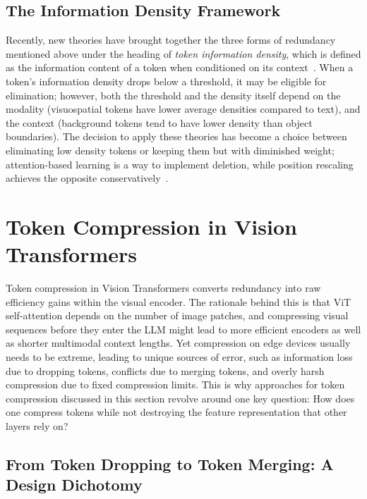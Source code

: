 \documentclass[10pt]{article}
\begin{document}
\subsection{The Information Density Framework}

Recently, new theories have brought together the three forms of redundancy
mentioned above under the heading of \emph{token information density}, which is defined
as the information content of a token when conditioned on its context~\citep{shao2026surveytokencompressionefficient}.
When a token's information density drops below a threshold, it may be
eligible for elimination; however, both the threshold and the density itself depend on
the modality (visuospatial tokens have lower average densities compared to text),
and the context (background tokens tend to have lower density than object boundaries).
The decision to apply these theories has become a choice between eliminating low
density tokens or keeping them but with diminished weight; attention-based learning
is a way to implement deletion, while position rescaling achieves the opposite
conservatively~\citep{mahajan2025attentionguidedalignmentefficient}.
\section{Token Compression in Vision Transformers}
\label{sec:vit}

Token compression in Vision Transformers converts redundancy into raw efficiency gains
within the visual encoder.  The rationale behind this is that ViT self-attention depends
on the number of image patches, and compressing visual sequences before they enter the LLM
might lead to more efficient encoders as well as shorter multimodal context lengths.  Yet
compression on edge devices usually needs to be extreme, leading to unique sources of error,
such as information loss due to dropping tokens, conflicts due to merging tokens, and overly
harsh compression due to fixed compression limits.  This is why approaches for token
compression discussed in this section revolve around one key question: How does one compress
tokens while not destroying the feature representation that other layers rely on?

\subsection{From Token Dropping to Token Merging: A Design Dichotomy}
\end{document}
